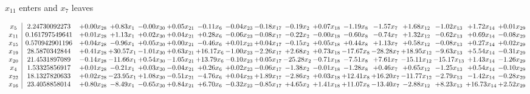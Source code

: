 \documentclass[9pt]{article}
\begin{document}
 $ x_{11} $ enters and $ x_{7} $ leaves 

 \[\begin{array}{c| c c@{\hskip 2pt} c@{\hskip 2pt} c@{\hskip 2pt} c@{\hskip 2pt} c@{\hskip 2pt} c@{\hskip 2pt} c@{\hskip 2pt} c@{\hskip 2pt} c@{\hskip 2pt} c@{\hskip 2pt} c@{\hskip 2pt} c@{\hskip 2pt} c@{\hskip 2pt} c@{\hskip 2pt} c@{\hskip 2pt} }
 x_{5}   &  2.24730092273 & +  0.00 x_{28} & +  0.83 x_{1} & -0.00 x_{30} & +  0.05 x_{21} & -0.11 x_{6} & -0.04 x_{23} & -0.18 x_{17} & -0.19 x_{2} & +  0.07 x_{18} & -1.19 x_{8} & -1.57 x_{7} & +  1.68 x_{12} & -1.02 x_{13} & +  1.72 x_{14} & +  0.01 x_{29}\\
 x_{11}   &  0.161797549641 & +  0.01 x_{28} & +  1.13 x_{1} & +  0.02 x_{30} & +  0.04 x_{21} & +  0.28 x_{6} & -0.06 x_{23} & -0.08 x_{17} & -0.22 x_{2} & -0.00 x_{18} & -0.60 x_{8} & -0.74 x_{7} & +  1.32 x_{12} & -0.62 x_{13} & +  0.69 x_{14} & -0.08 x_{29}\\
 x_{15}   &  0.570942901196 & +  0.04 x_{28} & -0.96 x_{1} & +  0.05 x_{30} & +  0.00 x_{21} & -0.46 x_{6} & +  0.01 x_{23} & +  0.04 x_{17} & -0.15 x_{2} & +  0.05 x_{18} & +  0.44 x_{8} & +  1.13 x_{7} & +  0.58 x_{12} & -0.08 x_{13} & +  0.27 x_{14} & +  0.02 x_{29}\\
 x_{19}   &  28.5870342844 & +  0.41 x_{28} & + 30.57 x_{1} & -1.01 x_{30} & +  0.63 x_{21} & + 16.17 x_{6} & -1.00 x_{23} & -2.26 x_{17} & +  2.68 x_{2} & +  0.73 x_{18} & -17.67 x_{8} & -28.28 x_{7} & + 18.95 x_{12} & -9.63 x_{13} & +  5.54 x_{14} & -0.31 x_{29}\\
 x_{20}   &  21.4531897089 & -0.14 x_{28} & -11.66 x_{1} & +  0.54 x_{30} & -1.05 x_{21} & + 13.79 x_{6} & -0.10 x_{23} & +  0.05 x_{17} & -25.28 x_{2} & -0.71 x_{18} & -7.51 x_{8} & +  7.61 x_{7} & -15.11 x_{12} & -15.17 x_{13} & +  1.43 x_{14} & -1.26 x_{29}\\
 x_{4}   &  1.53325856917 & +  0.01 x_{28} & -0.21 x_{1} & +  0.03 x_{30} & -0.04 x_{21} & +  0.26 x_{6} & +  0.02 x_{23} & -0.06 x_{17} & -1.38 x_{2} & -0.01 x_{18} & -1.28 x_{8} & +  0.46 x_{7} & +  0.65 x_{12} & -1.25 x_{13} & +  0.54 x_{14} & -0.10 x_{29}\\
 x_{22}   &  18.1327820633 & +  0.02 x_{28} & -23.95 x_{1} & +  1.08 x_{30} & -0.51 x_{21} & -4.76 x_{6} & +  0.04 x_{23} & +  1.89 x_{17} & -2.86 x_{2} & +  0.03 x_{18} & + 12.41 x_{8} & + 16.20 x_{7} & -11.77 x_{12} & -2.79 x_{13} & -1.42 x_{14} & -0.28 x_{29}\\
 x_{16}   &  23.4058858014 & +  0.80 x_{28} & -8.49 x_{1} & -0.65 x_{30} & +  0.84 x_{21} & +  6.70 x_{6} & -0.32 x_{23} & -0.85 x_{17} & +  4.65 x_{2} & +  1.41 x_{18} & + 11.07 x_{8} & -13.40 x_{7} & -2.88 x_{12} & +  8.23 x_{13} & + 16.73 x_{14} & +  2.52 x_{29}\\

\end{array}\]
\end{document}
